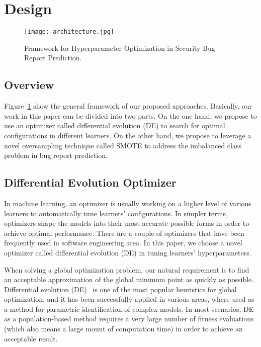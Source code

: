 \section{Design}
\label{design}

\begin{figure}[t]
\centerline{\texttt{[image: architecture.jpg]}}
\caption{Framework for Hyperparameter Optimization in Security Bug Report Prediction.}    
\label{figure:framework}
\end{figure}

\subsection{Overview}
Figure~\ref{figure:framework} show the general framework of our proposed approaches. Basically, our work in this paper can be divided into two parts. On the one hand, we propose to use an optimizer called differential evolution (DE) to search for optimal configurations in different learners. On the other hand, we propose to leverage a novel oversampling technique called SMOTE to address the imbalanced class problem in bug report prediction. 

\subsection{Differential Evolution Optimizer}
In machine learning, an optimizer is usually working on a higher level of various learners to automatically tune learners' configurations. In simpler terms, optimizers shape the models into their most accurate possible forms in order to achieve optimal performance. There are a couple of optimizers that have been frequently used in software engineering area. In this paper, we choose a novel optimizer called differential evolution (DE) in tuning learners' hyperparameters.


When solving a global optimization problem, our natural requirement is to find an acceptable approximation of the global minimum point as quickly as possible. Differential evolution (DE)~\cite{storn1997differential} is one of the most popular heuristics for global optimization, and it has been successfully applied in various areas, where used as a method for parametric identification of complex models. In most scenarios, DE as a population-based method requires a very large number of fitness evaluations (which also means a large mount of computation time) in order to achieve an acceptable result. 

